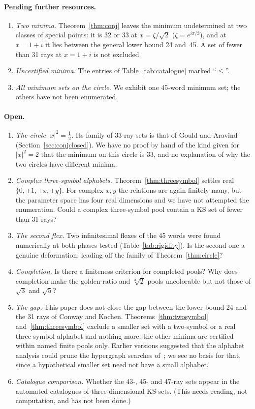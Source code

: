 \paragraph{Pending further resources.}
\begin{enumerate}
\item \emph{Two minima.}  Theorem~\ref{thm:conj} leaves the minimum undetermined at two
classes of special points: it is 32 or 33 at $x=\zeta/\sqrt2$ ($\zeta=e^{i\pi/3}$),
and at $x=1+i$ it lies between the general lower bound 24 and~45.  A set of fewer than 31 rays
at $x=1+i$ is not excluded.
\item \emph{Uncertified minima.}  The entries of Table~\ref{tab:catalogue} marked ``$\le$''.
\item \emph{All minimum sets on the circle.}  We exhibit one 45-word minimum set; the others have
not been enumerated.
\end{enumerate}

\paragraph{Open.}
\begin{enumerate}[resume]
\item \emph{The circle $|x|^2=\tfrac12$.}  Its family of 33-ray sets is that of Gould and
Aravind (Section~\ref{sec:conjclosed}).  We have no proof by hand of the kind given for
$|x|^2=2$ that the minimum on this circle is 33, and no explanation of why the two circles have
different minima.
\item \emph{Complex three-symbol alphabets.}  Theorem~\ref{thm:threesymbol} settles real
$\{0,\pm1,\pm x,\pm y\}$.  For complex $x,y$ the relations are again finitely many, but the
parameter space has four real dimensions and we have not attempted the enumeration.  Could a
complex three-symbol pool contain a KS set of fewer than 31 rays?
\item \emph{The second flex.}  Two infinitesimal flexes of the 45 words were found numerically
at both phases tested (Table~\ref{tab:rigidity}).  Is the second one a genuine deformation, leading off the
family of Theorem~\ref{thm:circle}?
\item \emph{Completion.}  Is there a finiteness criterion for completed pools?  Why does
completion make the golden-ratio and $\sqrt[3]2$ pools uncolorable but not those of $\sqrt3$ and
$\sqrt5$?
\item \emph{The gap.}  This paper does not close the gap between the lower bound 24 and
the 31 rays of Conway and Kochen.  Theorems~\ref{thm:twosymbol} and~\ref{thm:threesymbol} exclude a
smaller set with a two-symbol or a real three-symbol alphabet and nothing more; the other minima are certified within named finite pools
only.  Earlier
versions suggested that the alphabet analysis could prune the hypergraph searches
of~\cite{LiBrightGanesh2024,KirchwegerPeitlSzeider2023}; we see no basis for that, since a
hypothetical smaller set need not have a small alphabet.
\item \emph{Catalogue comparison.}  Whether the 43-, 45- and 47-ray sets appear in the automated
catalogues of three-dimensional KS sets.  (This needs reading, not computation, and has not been
done.)
\end{enumerate}

